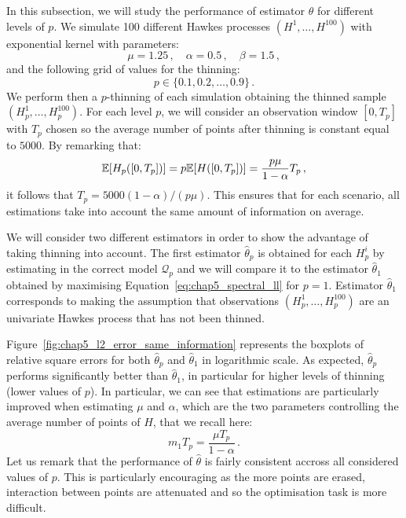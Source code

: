     In this subsection, we will study the performance of estimator $\hat\theta$ for different levels of $p$.
    We simulate 100 different Hawkes processes $(H^1,\ldots, H^{100})$ with exponential kernel with parameters:
    \[\mu = 1.25\,,\quad \alpha = 0.5\,,\quad \beta = 1.5\,,\]
    and the following grid of values for the thinning:
    \[p\in\{0.1, 0.2, \ldots, 0.9\}\,.\]
    We perform then a $p$-thinning of each simulation obtaining the thinned sample $(H_p^1, \ldots, H_p^{100})$.
    For each level $p$, 
    we will consider an observation window $[0,T_p]$ with $T_p$ chosen so the average number of points after thinning is constant equal to $5000$.
    By remarking that:
    \[{\mathbb E}[H_p([0, T_p])] = p{\mathbb E}[H([0,T_p])] = \frac{ p \mu }{1-\alpha} T_p\,,\]
    it follows that $T_p = 5000 (1-\alpha) / (p \mu)$.
    This ensures that for each scenario, all estimations take into account the same amount of information on average.

    We will consider two different estimators in order to show the advantage of taking thinning into account.
    The first estimator $\hat \theta_p$ is obtained for each $H_p^i$ by estimating in the correct model $\mathcal{Q}_p$ 
    and we will compare it to the estimator $\hat \theta_1$ obtained by maximising Equation~\eqref{eq:chap5_spectral_ll}
    for $p=1$.
    Estimator $\hat \theta_1$ corresponds to making the assumption that observations $(H_p^1, \ldots, H_p^{100})$
    are an univariate Hawkes process that has not been thinned.

    Figure~\ref{fig:chap5_l2_error_same_information} represents the boxplots of relative square errors for both $\hat \theta_p$ and $\hat \theta_1$ in logarithmic scale.
    As expected, $\hat \theta_p$ performs significantly better than $\hat \theta_1$, 
    in particular for higher levels of thinning (lower values of $p$).
    In particular, we can see that estimations are particularly improved when estimating $\mu$ and $\alpha$,
    which are the two parameters controlling the average number of points of $H$, that we recall here:
    \[m_1 T_p = \frac{\mu T_p}{1-\alpha}\,.\]
    Let us remark that the performance of $\hat \theta$ is fairly consistent accross all considered values of $p$.
    This is particularly encouraging as the more points are erased, 
    interaction between points are attenuated and so the optimisation task is more difficult.

